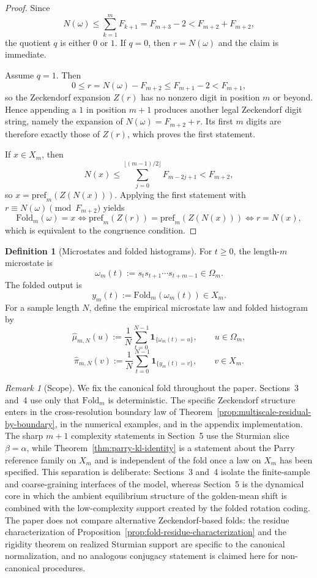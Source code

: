\documentclass[11pt,letterpaper]{article}
\numberwithin{equation}{section}
\theoremstyle{plain}
\theoremstyle{definition}
\newtheorem{definition}[theorem]{Definition}
\theoremstyle{remark}
\newtheorem{remark}[theorem]{Remark}
\newcommand{\Fold}{\mathrm{Fold}}
\newcommand{\pref}{\mathrm{pref}}
\begin{document}
\begin{proof}
Since
\[
N(\omega)\le \sum_{k=1}^m F_{k+1}=F_{m+3}-2<F_{m+2}+F_{m+2},
\]
the quotient \(q\) is either \(0\) or \(1\). If \(q=0\), then \(r=N(\omega)\)
and the claim is immediate.

Assume \(q=1\). Then
\[
0\le r=N(\omega)-F_{m+2}\le F_{m+1}-2<F_{m+1},
\]
so the Zeckendorf expansion \(Z(r)\) has no nonzero digit in position \(m\) or
beyond. Hence appending a \(1\) in position \(m+1\) produces another legal
Zeckendorf digit string, namely the expansion of \(N(\omega)=F_{m+2}+r\). Its
first \(m\) digits are therefore exactly those of \(Z(r)\), which proves the
first statement.

If \(x\in X_m\), then
\[
N(x)\le \sum_{j=0}^{\lfloor (m-1)/2\rfloor}F_{m-2j+1}<F_{m+2},
\]
so \(x=\pref_m(Z(N(x)))\). Applying the first statement with
\(r\equiv N(\omega)\pmod{F_{m+2}}\) yields
\[
\Fold_m(\omega)=x
\iff
\pref_m(Z(r))=\pref_m(Z(N(x)))
\iff
r=N(x),
\]
which is equivalent to the congruence condition.
\end{proof}

\begin{definition}[Microstates and folded histograms]
For $t\ge 0$, the length-$m$ microstate is
\[
\omega_m(t):=s_t s_{t+1}\cdots s_{t+m-1}\in\Omega_m.
\]
The folded output is
\[
y_m(t):=\Fold_m(\omega_m(t))\in X_m.
\]
For a sample length $N$, define the empirical microstate law and folded
histogram by
\[
\hat\mu_{m,N}(u):=\frac{1}{N}\sum_{t=0}^{N-1}\mathbf{1}_{\{\omega_m(t)=u\}},
\qquad u\in\Omega_m,
\]
\[
\hat\pi_{m,N}(v):=\frac{1}{N}\sum_{t=0}^{N-1}\mathbf{1}_{\{y_m(t)=v\}},
\qquad v\in X_m.
\]
\end{definition}

\begin{remark}[Scope]\label{rem:scope-fold-assumptions}
We fix the canonical fold throughout the paper. Sections~3 and~4 use only that
\(\Fold_m\) is deterministic. The specific Zeckendorf structure enters in the
cross-resolution boundary law of
Theorem~\ref{prop:multiscale-residual-by-boundary}, in the numerical examples,
and in the appendix implementation. The sharp \(m+1\) complexity statements in
Section~5 use the Sturmian slice \(\beta=\alpha\), while
Theorem~\ref{thm:parry-kl-identity} is a statement about the Parry reference
family on \(X_m\) and is independent of the fold once a law on \(X_m\) has
been specified. This separation is deliberate: Sections~3 and~4 isolate the
finite-sample and coarse-graining interfaces of the model, whereas Section~5 is
the dynamical core in which the ambient equilibrium structure of the
golden-mean shift is combined with the low-complexity support created by the
folded rotation coding.
The paper does not compare alternative Zeckendorf-based folds: the residue
characterization of Proposition~\ref{prop:fold-residue-characterization} and
the rigidity theorem on realized Sturmian support are specific to the canonical
normalization, and no analogous conjugacy statement is claimed here for
non-canonical procedures.
\end{remark}
\end{document}
